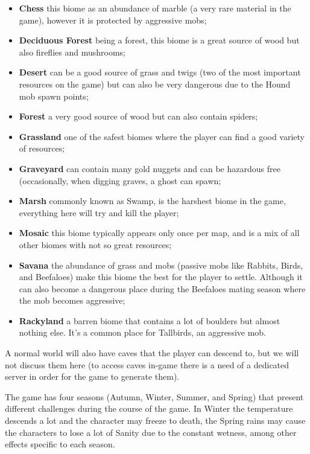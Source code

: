 \begin{itemize}
\item \textbf{Chess} this biome as an abundance of marble (a very rare material in the game), however it is protected by aggressive mobs;
\item \textbf{Deciduous Forest} being a forest, this biome is a great source of wood but also fireflies and mushrooms;
\item \textbf{Desert} can be a good source of grass and twigs (two of the most important resources on the game) but can also be very dangerous due to the Hound mob spawn points;
\item \textbf{Forest} a very good source of wood but can also contain spiders;
\item \textbf{Grassland} one of the safest biomes where the player can find a good variety of resources;
\item \textbf{Graveyard} can contain many gold nuggets and can be hazardous free (occasionally, when digging graves, a ghost can spawn;
\item \textbf{Marsh} commonly known as Swamp, is the harshest biome in the game, everything here will try and kill the player;
\item \textbf{Mosaic} this biome typically appears only once per map, and is a mix of all other biomes with not so great resources;
\item \textbf{Savana} the abundance of grass and mobs (passive mobs like Rabbits, Birds, and Beefaloes) make this biome the best for the player to settle.
Although it can also become a dangerous place during the Beefaloes mating season where the mob becomes aggressive;
\item \textbf{Rackyland} a barren biome that contains a lot of boulders but almost nothing else. It’s a common place for Tallbirds, an aggressive mob.
\end{itemize}

A normal world will also have caves that the player can descend to, but we will not discuss them here (to access caves in-game there is a need of a dedicated server in order for the game to generate them).

The game has four seasons (Autumn, Winter, Summer, and Spring) that present different challenges during the course of the game.
In Winter the temperature descends a lot and the character may freeze to death, the Spring rains may cause the characters to lose a lot of Sanity due to the constant wetness, among other effects specific to each season.

